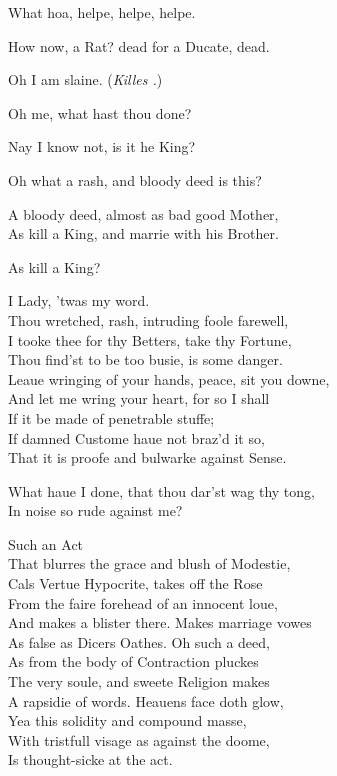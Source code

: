 \documentclass[a5paper,DIV=calc,11pt]{scrbook}
\begin{document}
\begin{drama*}
    \polspeaks What hoa, helpe, helpe, helpe.
    
    \hamspeaks How now, a Rat? dead for a Ducate, dead.
    
    \polspeaks Oh I am slaine. \hfill(\textit{Killes \pol.})
    
    \queenspeaks Oh me, what hast thou done?
    
    \hamspeaks Nay I know not, is it he King?
    
    \queenspeaks Oh what a rash, and bloody deed is this?
    
    \hamspeaks A bloody deed, almost as bad good Mother,\\
    As kill a King, and marrie with his Brother.
    
    \queenspeaks As kill a King?
    
    \hamspeaks I Lady, 'twas my word.\\
    Thou wretched, rash, intruding foole farewell,\\
    I tooke thee for thy Betters, take thy Fortune,\\
    Thou find'st to be too busie, is some danger.\\
    Leaue wringing of your hands, peace, sit you downe,\\
    And let me wring your heart, for so I shall\\
    If it be made of penetrable stuffe;\\
    If damned Custome haue not braz'd it so,\\
    That it is proofe and bulwarke against Sense.
    
    \queenspeaks What haue I done, that thou dar'st wag thy tong,\\
    In noise so rude against me?
    
    \hamspeaks Such an Act\\
    That blurres the grace and blush of Modestie,\\
    Cals Vertue Hypocrite, takes off the Rose\\
    From the faire forehead of an innocent loue,\\
    And makes a blister there. Makes marriage vowes\\
    As false as Dicers Oathes. Oh such a deed,\\
    As from the body of Contraction pluckes\\
    The very soule, and sweete Religion makes\\
    A rapsidie of words. Heauens face doth glow,\\
    Yea this solidity and compound masse,\\
    With tristfull visage as against the doome,\\
    Is thought-sicke at the act.
    

\end{drama*}
\end{document}
